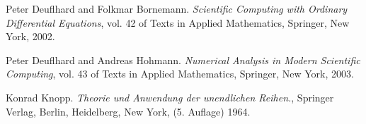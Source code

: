 \begin{thebibliography}{9}
Peter Deuflhard and Folkmar Bornemann. {\it Scientific Computing with Ordinary Differential Equations}, vol. 42 of Texts in Applied Mathematics, Springer, New York, 2002.

Peter Deuflhard and Andreas Hohmann. {\it Numerical Analysis in Modern Scientific Computing}, vol. 43 of Texts in Applied Mathematics, Springer, New York, 2003. 

Konrad Knopp. {\it Theorie und Anwendung der unendlichen Reihen.}, Springer Verlag, Berlin, Heidelberg, New York, (5. Auflage) 1964. 
\end{thebibliography}